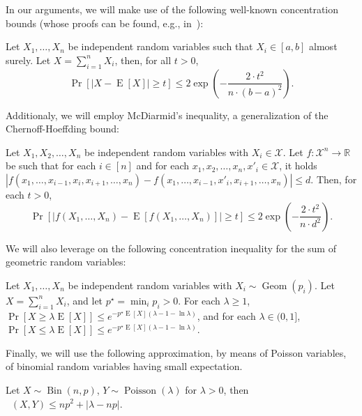 \documentclass[11pt]{article}
\DeclareMathOperator{\geom}{Geom}
\DeclareMathOperator*{\E}{E}
\DeclareMathOperator*{\Bin}{Bin}
\DeclareMathOperator*{\Poisson}{Poisson}
\DeclareMathOperator*{\dTV}{\textit{d}_{TV}}
\begin{document}
\smallskip

In our arguments, we will make use of the following well-known concentration bounds (whose proofs can be found, e.g., in~\cite{dp09}): 
\begin{fact}\label{fact:chernoff-hoeffding}
Let $X_1, \dots, X_n$ be independent random variables such that $X_i\in [a,b]$ almost surely. Let $X=\sum_{i=1}^n X_i$, then, for all $t>0$, $$\Pr[|X - \E[X]| \geq t] \leq 2 \exp\left(- \frac{2\cdot t^2}{n\cdot(b-a)^2}\right).$$
\end{fact}
Additionaly, we will employ McDiarmid's inequality, a generalization of the Chernoff-Hoeffding bound:
\begin{fact}
\label{fact:mcdiarmid}
Let $X_1, X_2, \dots, X_n$ be independent random variables with $X_i\in \mathcal{X}$. Let $f:\mathcal{X}^n \rightarrow \mathbb{R}$ be such that for each $i\in[n]$ and for each $x_1, x_2, \dots, x_n, x'_i \in \mathcal{X}$, it holds $|f(x_1, \dots, x_{i-1}, x_i, x_{i+1}, \dots, x_n) - f(x_1, \dots, x_{i-1}, x'_i, x_{i+1}, \dots, x_n)| \leq d$. Then, for each $t>0$, 
\[
\Pr[|f(X_1, \dots, X_n) - \E[f(X_1, \dots, X_n)]| \ge t] \leq 2 \exp\left(- \frac{2 \cdot t^2}{n\cdot d^2}\right).
\]
\end{fact}
We will also leverage on the following concentration inequality for the sum of geometric random variables:
\begin{fact}\label{fact:geom-concentration} Let $X_1, \dots, X_n$ be independent random variables with $X_i\sim\geom(p_i)$. Let $X=\sum_{i=1}^n X_i$, and let $p^\star=\min_i p_i > 0$. For each $\lambda\ge 1$, $\Pr[X\ge \lambda \E[X]] \leq e^{-p^\star \E[X] (\lambda-1-\ln\lambda)}$, and for each $\lambda\in(0,1]$, $\Pr[X\le \lambda \E[X]] \leq e^{-p^\star \E[X] (\lambda-1-\ln\lambda)}$.
\end{fact}
Finally, we will use the following  approximation, by means of Poisson variables, of binomial random variables having small expectation.\begin{fact}\label{fact:lecam}
Let $X\sim\Bin(n,p)$, $Y\sim \Poisson(\lambda)$ for $\lambda > 0$, then $\dTV(X,Y) \leq np^2 + |\lambda - np|$.
\end{fact}


  
\end{document}
